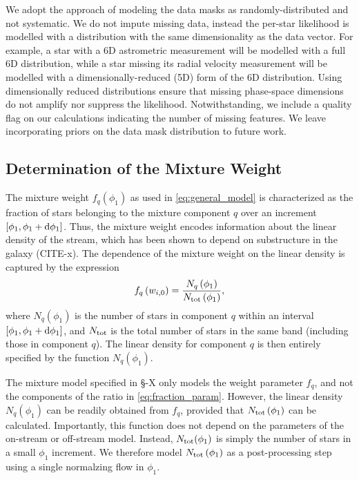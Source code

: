 \documentclass[twocolumn]{aastex631}
\begin{document}
        We adopt the approach of modeling the data masks as randomly-distributed and not systematic. We do not impute missing data, instead the per-star likelihood is modelled with a distribution with the same dimensionality as the data vector.
        For example, a star with a 6D astrometric measurement will be modelled with a full 6D distribution, while a star missing its radial velocity measurement will be modelled with a dimensionally-reduced (5D) form of the 6D distribution. Using dimensionally reduced distributions ensure that missing phase-space dimensions do not amplify nor suppress the likelihood. 
        Notwithstanding, we include a quality flag on our calculations indicating the number of missing features.
        We leave incorporating priors on the data mask distribution to future work. 


    \vspace{10pt}
    \subsection{Determination of the Mixture Weight} \label{sub:mixture_weight}
        The mixture weight $f_q(\phi_1)$ as used in \autoref{eq:general_model} is characterized as the fraction of stars belonging to the mixture component $q$ over an increment $[\phi_1, \phi_1 + \dif{\phi_1}]$. Thus, the mixture weight encodes information about the linear density of the stream, which has been shown to depend on substructure in the galaxy (CITE-x). The dependence of the mixture weight on the linear density is captured by the expression
        \begin{equation}\label{eq:fraction_param}
            f_q\left(w_{i,0}\right) = \frac{N_q\left(\phi_1\right)}{N_{\rm tot}\left(\phi_1\right)},
        \end{equation}
        where $N_q\left(\phi_1\right)$ is the number of stars in component $q$ within an interval $[\phi_1, \phi_1 + \dif{\phi_1}]$, and 
        $N_{\rm tot}$ is the total number of stars in the same band (including those in component $q$). The linear  density for component $q$ is then entirely specified by the function $N_q(\phi_1)$.

        The mixture model specified in \S-X only models the weight parameter $f_q$, and not the components of the ratio in \autoref{eq:fraction_param}. However, the linear density $N_q(\phi_1)$ can be readily obtained from $f_q$, provided that $N_{\rm tot}\left(\phi_1\right)$ can be calculated. Importantly, this function does not depend on the parameters of the on-stream or off-stream model. Instead, $N_{\rm tot}(\phi_1)$ is simply the number of stars in a small $\phi_1$ increment. We therefore model $N_{\rm tot}\left(\phi_1\right)$ as a post-processing step using a single normalzing flow in $\phi_1$. 
\end{document}
